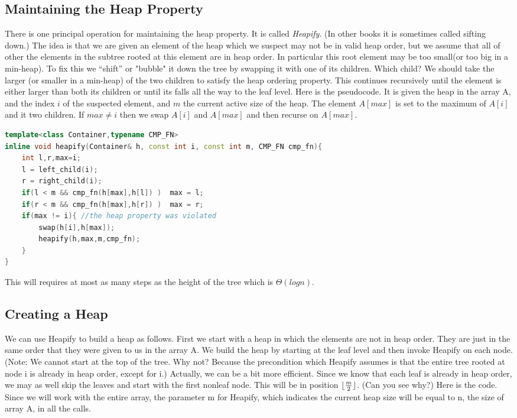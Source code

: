 \subsection{Maintaining the Heap Property}
There is one principal operation for maintaining the heap property. It is
called \textit{Heapify}. (In other books it is sometimes called sifting down.) The idea is that we are given an element of the heap which we suspect may not be in valid heap order, but we assume that all of other the elements in the subtree rooted at this element are in heap order. In particular this root element may be too small(or too big in a min-heap). To fix this we “shift” or "bubble" it down the tree by swapping it with one of its children. Which child? We should take the larger (or smaller in a min-heap) of the two children to satisfy the heap ordering property. This continues recursively until the element is either larger than both its children or until its falls all the way to the leaf level. Here is the pseudocode. It is given the heap in the array A, and the index $i$ of the suspected element, and $m$ the current active size of the heap. The element $A[max]$ is set to the maximum of $A[i]$ and it two children. If $max \neq i$ then we swap $A[i]$ and $A[max]$ and then recurse on $A[max]$.


\begin{lstlisting}[language=c++, caption="Heapify procedure in heapsort"]
template<class Container,typename CMP_FN>
inline void heapify(Container& h, const int i, const int m, CMP_FN cmp_fn){
    int l,r,max=i;
    l = left_child(i);
    r = right_child(i);
    if(l < m && cmp_fn(h[max],h[l]) )  max = l;
    if(r < m && cmp_fn(h[max],h[r]) )  max = r;
    if(max != i){ //the heap property was violated
        swap(h[i],h[max]);
        heapify(h,max,m,cmp_fn);
    }
}
\end{lstlisting}
This will requires at most as many steps as the height of the tree which is $\mathcal{\Theta}(log n)$.
\subsection{Creating a Heap}
We can use Heapify to build a heap as follows. First we start with a heap in which the elements are not in heap order. They are just in the same order that they were given to us in the array A. We build the heap by starting at the leaf level and then invoke Heapify on each node. (Note: We cannot start at the top of the tree. Why not? Because the precondition which Heapify assumes is that the entire tree rooted at node i is already in heap order, except for i.) Actually, we can be a bit more efficient. Since we know that each leaf is already in heap order, we may as well skip the leaves and start with the first nonleaf node. This will be in position $\lfloor\frac{m}{2}\rfloor$. (Can you see why?)
Here is the code. Since we will work with the entire array, the parameter m for Heapify, which indicates
the current heap size will be equal to n, the size of array A, in all the calls.

